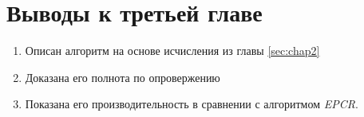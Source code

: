 \newpage
\section{Выводы к третьей главе}
\begin{enumerate}
	\item Описан алгоритм на основе исчисления из главы \ref{sec:chap2}
    \item Доказана его полнота по опровержению
    \item Показана его производительность в сравнении с алгоритмом \emph{EPCR}.
\end{enumerate}